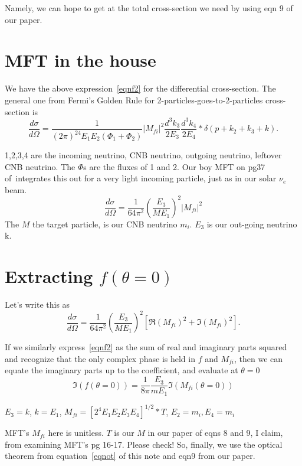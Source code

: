 \documentclass[reprint,onecolumn,superscriptaddress,preprintnumbers]{revtex4}%
\begin{document}
Namely, we can hope to get at the total cross-section we need by using eqn 9 of our paper.

\section{MFT in the house}
We have the above expression~\ref{eqnf2} for the differential cross-section. The general one from Fermi's Golden Rule for 2-particles-goes-to-2-particles cross-section is
\begin{equation}
\frac{d\sigma}{d\Omega} = \frac{1}{(2\pi)^24E_1E_2(\Phi_1+\Phi_2)} |M_{fi}|^2 \frac{d^3k_3}{2E_3} \frac{d^3k_4}{2E_4} *\delta(p+k_2+k_3+k).
\end{equation}

1,2,3,4 are the incoming neutrino, CNB neutrino, outgoing neutrino, leftover CNB neutrino. The $\Phi$s are the fluxes of 1 and 2. Our boy MFT on pg37 of~\cite{mft}integrates this out for a very light incoming particle, just as in our solar $\nu_e$ beam.
\begin{equation}
\frac{d\sigma}{d\Omega} = \frac{1}{64\pi^2}(\frac{E_3}{ME_1})^2 |M_{fi}|^2
\end{equation}
The $M$  the target particle, is our CNB neutrino $m_i$. $E_3$ is our out-going neutrino k. 

\section{Extracting $f(\theta=0)$}
Let's write this as 
\begin{equation}
\frac{d\sigma}{d\Omega} = \frac{1}{64\pi^2}(\frac{E_3}{ME_1})^2[\Re(M_{fi})^2+\Im(M_{fi})^2].
\end{equation}

If we similarly express~\ref{eqnf2} as the sum of real and imaginary parts squared and recognize that the only complex phase is held in $f$ and $M_{fi}$, then we can equate
the imaginary parts up to the coefficient, and evaluate at $\theta=0$
\begin{equation}
\Im (f(\theta=0)) = \frac{1}{8\pi}\frac{E_3}{mE_1}\Im(M_{fi}(\theta=0))
\end{equation}

$E_3 = k$, $k=E_1$, $M_{fi}=[2^4E_1E_2E_3E_4]^{1/2}*T$, $E_2=m_i, E_4=m_i$

MFT's $M_{fi}$ here is unitless. $T$ is our $M$ in our paper of eqns 8 and 9, I claim, from examining MFT's pg 16-17. Please check! So, finally, we use the optical theorem from equation~\ref{eqnot} of this note and eqn9 from our paper.
\end{document}
